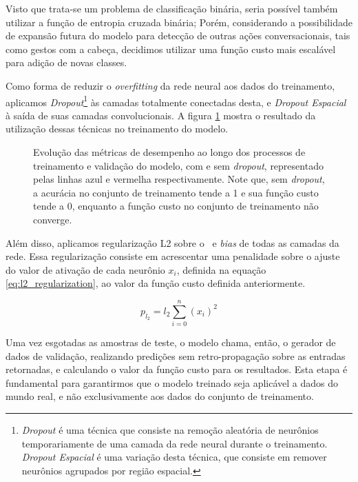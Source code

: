 Visto que trata-se um problema de classificação binária, seria possível também utilizar a função de entropia cruzada binária; Porém, considerando a possibilidade de expansão futura do modelo para detecção de outras ações conversacionais, tais como gestos com a cabeça, decidimos utilizar uma função custo mais escalável para adição de novas classes.

Como forma de reduzir o \textit{overfitting} da rede neural aos dados do treinamento, aplicamos \textit{Dropout}\footnote{\textit{Dropout} é uma técnica que consiste na remoção aleatória de neurônios temporariamente de uma camada da rede neural durante o treinamento. \textit{Dropout Espacial} é uma variação desta técnica, que consiste em remover neurônios agrupados por região espacial.} às camadas totalmente conectadas desta, e \textit{Dropout Espacial} à saída de suas camadas convolucionais.
A figura \ref{fig:training_metrics} mostra o resultado da utilização dessas técnicas no treinamento do modelo.

\begin{figure}[ht]
    \centering
    \resizebox{0.95\textwidth}{!}{
        
    }
    \caption{Evolução das métricas de desempenho ao longo dos processos de treinamento e validação do modelo, com e sem \textit{dropout}, representado pelas linhas azul e vermelha respectivamente. Note que, sem \textit{dropout}, a acurácia no conjunto de treinamento tende a 1 e sua função custo tende a 0, enquanto a função custo no conjunto de treinamento não converge. }
    \label{fig:training_metrics}
\end{figure}

Além disso, aplicamos regularização L2 sobre o \ e \textit{bias} de todas as camadas da rede.
Essa regularização consiste em acrescentar uma penalidade sobre o ajuste do valor de ativação de cada neurônio $x_i$, definida na equação \ref{eq:l2_regularization}, ao valor da função custo definida anteriormente.

\begin{equation}\label{eq:l2_regularization}
    p_{l_2} = l_2 \sum\limits_{i=0}^n(x_i)^2
\end{equation}

Uma vez esgotadas as amostras de teste, o modelo chama, então, o gerador de dados de validação, realizando predições sem retro-propagação sobre as entradas retornadas, e calculando o valor da função custo para os resultados.
Esta etapa é fundamental para garantirmos que o modelo treinado seja aplicável a dados do mundo real, e não exclusivamente aos dados do conjunto de treinamento.

